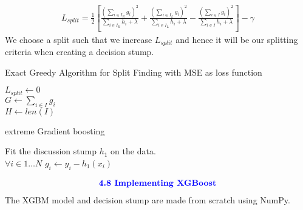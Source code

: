 \documentclass{homework}
\begin{document}
 \begin{align*}
    L_{split} = \frac{1}{2}\left[ \frac{(\sum_{i \in I_R} g_i)^2}{\sum_{i \in I_R}h_i + \lambda} + \frac{(\sum_{i \in I_L} g_i)^2}{\sum_{i \in I_L}h_i + \lambda} - \frac{(\sum_{i \in I} g_i)^2}{\sum_{i \in I}h_i + \lambda} \right] - \gamma
 \end{align*}
 We choose a split such that we increase $L_{split}$ and hence it will be our splitting criteria when creating a decision stump.
 \begin{algorithm*}
    \caption{Exact Greedy Algorithm for Split Finding with MSE as loss function}
    $L_{split} \gets 0$ \\
    $G \gets \sum_{i \in I} g_i$ \\
    $H \gets len(I)$ \\
 \end{algorithm*}
 \begin{algorithm*}[!ht]
    \caption{extreme Gradient boosting}
    Fit the discussion stump $h_1$  on the data.\\
    $\forall i\in{1 \dots N}$ $g_i \gets y_i - h_1(x_i)$ \\
 \end{algorithm*}
\newpage
 \begin{align*}
    \textcolor{blue}{ \text{{\textbf{4.8 Implementing XGBoost}}}}
 \end{align*}
 The XGBM model and decision stump are made from scratch using NumPy.
 
\end{document}
